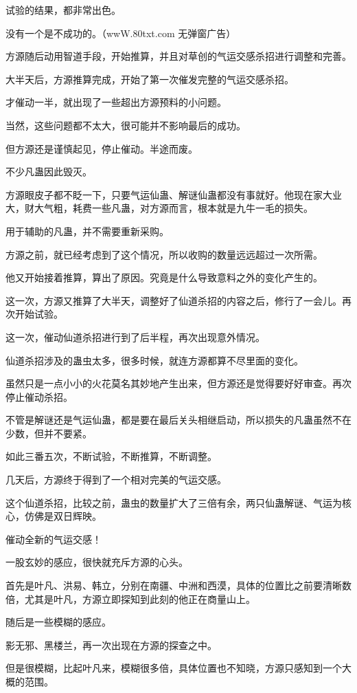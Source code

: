 \begin{this_body}
试验的结果，都非常出色。

没有一个是不成功的。（wwW.80txt.com 无弹窗广告）

方源随后动用智道手段，开始推算，并且对草创的气运交感杀招进行调整和完善。

大半天后，方源推算完成，开始了第一次催发完整的气运交感杀招。

才催动一半，就出现了一些超出方源预料的小问题。

当然，这些问题都不太大，很可能并不影响最后的成功。

但方源还是谨慎起见，停止催动。半途而废。

不少凡蛊因此毁灭。

方源眼皮子都不眨一下，只要气运仙蛊、解谜仙蛊都没有事就好。他现在家大业大，财大气粗，耗费一些凡蛊，对方源而言，根本就是九牛一毛的损失。

用于辅助的凡蛊，并不需要重新采购。

方源之前，就已经考虑到了这个情况，所以收购的数量远远超过一次所需。

他又开始接着推算，算出了原因。究竟是什么导致意料之外的变化产生的。

这一次，方源又推算了大半天，调整好了仙道杀招的内容之后，修行了一会儿。再次开始试验。

这一次，催动仙道杀招进行到了后半程，再次出现意外情况。

仙道杀招涉及的蛊虫太多，很多时候，就连方源都算不尽里面的变化。

虽然只是一点小小的火花莫名其妙地产生出来，但方源还是觉得要好好审查。再次停止催动杀招。

不管是解谜还是气运仙蛊，都是要在最后关头相继启动，所以损失的凡蛊虽然不在少数，但并不要紧。

如此三番五次，不断试验，不断推算，不断调整。

几天后，方源终于得到了一个相对完美的气运交感。

这个仙道杀招，比较之前，蛊虫的数量扩大了三倍有余，两只仙蛊解谜、气运为核心，仿佛是双日辉映。

催动全新的气运交感！

一股玄妙的感应，很快就充斥方源的心头。

首先是叶凡、洪易、韩立，分别在南疆、中洲和西漠，具体的位置比之前要清晰数倍，尤其是叶凡，方源立即探知到此刻的他正在商量山上。

随后是一些模糊的感应。

影无邪、黑楼兰，再一次出现在方源的探查之中。

但是很模糊，比起叶凡来，模糊很多倍，具体位置也不知晓，方源只感知到一个大概的范围。


\end{this_body}

